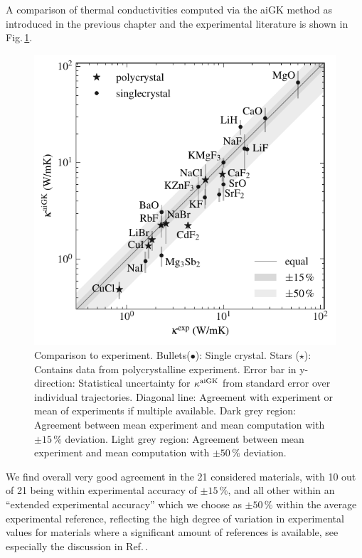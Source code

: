 A comparison of thermal conductivities computed via the aiGK method as introduced in the previous chapter and the experimental literature is shown in Fig.\,\ref{fig:kappa_exp}.
%
\begin{figure}
	\includegraphics[width=\textwidth]{./data/plots/kappa_vs_exp_trusted/kappa_vs_exp_corrected_annotated.pdf}
	\caption{Comparison to experiment. Bullets($\bullet$): Single crystal. Stars ($\star$): Contains data from polycrystalline experiment. Error bar in y-direction: Statistical uncertainty for $\kappa^{\rm aiGK}$ from standard error over individual trajectories. Diagonal line: Agreement with experiment or mean of experiments if multiple available. Dark grey region: Agreement between mean experiment and mean computation with $\pm 15\,\%$ deviation. Light grey region: Agreement between mean experiment and mean computation with $\pm 50\,\%$ deviation.}
	\label{fig:kappa_exp}
\end{figure}
%
We find overall very good agreement in the 21 considered materials, with 10 out of 21 being within experimental accuracy of $\pm 15\,\%$, and all other within an ``extended experimental accuracy'' which we choose as $\pm 50\,\%$ within the average experimental reference, reflecting the high degree of variation in experimental values for materials where a significant amount of references is available, see especially the discussion in Ref.\,\cite{wei2016}. 

